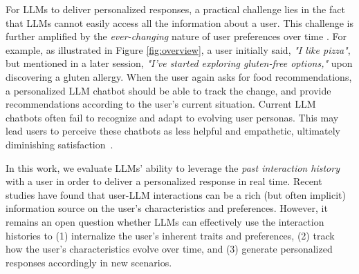 For LLMs to deliver personalized responses, a practical challenge lies in the fact that LLMs cannot easily access all the information about a user. 
This challenge is further amplified by the \textit{ever-changing} nature of user preferences over time \citep{radlinski2017theoretical, dean2022preference}. For example, as illustrated in Figure \ref{fig:overview}, a user initially said, \textit{"I like pizza"}, but mentioned in a later session, \textit{"I've started exploring gluten-free options,"} upon discovering a gluten allergy. 
When the user again asks for food recommendations, a personalized LLM chatbot should be able to track the change, and provide recommendations according to the user's current situation. Current LLM chatbots often fail to recognize and adapt to evolving user personas. This may lead users to perceive these chatbots as less helpful and empathetic, ultimately diminishing satisfaction~\citep{aggarwal2023artificial, ait2023power}. 


In this work, we evaluate LLMs' ability to leverage the \textit{past interaction history} with a user in order to deliver a personalized response in real time. Recent studies \citep{lin-etal-2024-interpretable, shi2024wildfeedback, zhao2025prefeval} have found that user-LLM interactions can be a rich (but often implicit) information source on the user's characteristics and preferences.
However, it remains an open question whether LLMs can effectively use the interaction histories to (1) internalize the user’s inherent traits and preferences, (2) track how the user's characteristics evolve over time, and (3) generate personalized responses accordingly in new scenarios.

